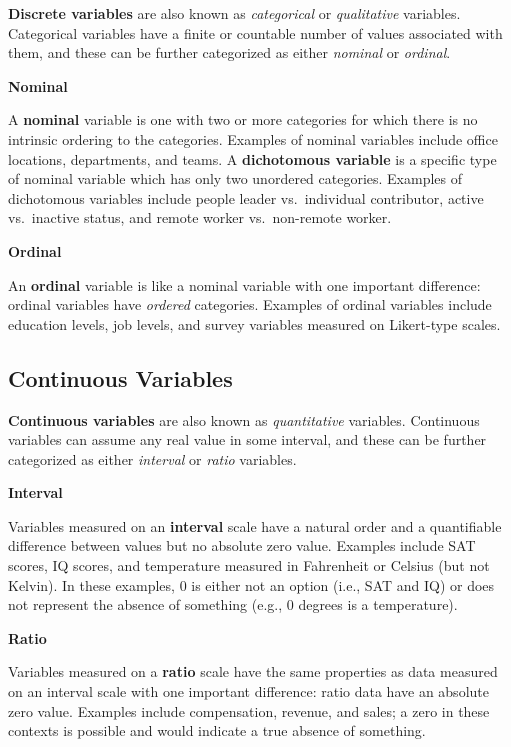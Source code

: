 \documentclass[
]{book}
\begin{document}
\textbf{Discrete variables} are also known as \emph{categorical} or \emph{qualitative} variables. Categorical variables have a finite or countable number of values associated with them, and these can be further categorized as either \emph{nominal} or \emph{ordinal}.

\textbf{Nominal}

A \textbf{nominal} variable is one with two or more categories for which there is no intrinsic ordering to the categories. Examples of nominal variables include office locations, departments, and teams. A \textbf{dichotomous variable} is a specific type of nominal variable which has only two unordered categories. Examples of dichotomous variables include people leader vs.~individual contributor, active vs.~inactive status, and remote worker vs.~non-remote worker.

\textbf{Ordinal}

An \textbf{ordinal} variable is like a nominal variable with one important difference: ordinal variables have \emph{ordered} categories. Examples of ordinal variables include education levels, job levels, and survey variables measured on Likert-type scales.

\hypertarget{continuous-variables}{%
\subsection{Continuous Variables}\label{continuous-variables}}

\textbf{Continuous variables} are also known as \emph{quantitative} variables. Continuous variables can assume any real value in some interval, and these can be further categorized as either \emph{interval} or \emph{ratio} variables.

\textbf{Interval}

Variables measured on an \textbf{interval} scale have a natural order and a quantifiable difference between values but no absolute zero value. Examples include SAT scores, IQ scores, and temperature measured in Fahrenheit or Celsius (but not Kelvin). In these examples, 0 is either not an option (i.e., SAT and IQ) or does not represent the absence of something (e.g., 0 degrees is a temperature).

\textbf{Ratio}

Variables measured on a \textbf{ratio} scale have the same properties as data measured on an interval scale with one important difference: ratio data have an absolute zero value. Examples include compensation, revenue, and sales; a zero in these contexts is possible and would indicate a true absence of something.
\end{document}
